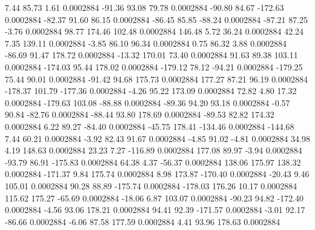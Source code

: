         7.44       85.73        1.61     0.0002884
      -91.36       93.08       79.78     0.0002884
      -90.80       84.67     -172.63     0.0002884
      -82.37       91.60       86.15     0.0002884
      -86.45       85.85      -88.24     0.0002884
      -87.21       87.25       -3.76     0.0002884
       98.77      174.46      102.48     0.0002884
      146.48        5.72       36.24     0.0002884
       42.24        7.35      139.11     0.0002884
       -3.85       86.10       96.34     0.0002884
        0.75       86.32        3.88     0.0002884
      -86.69       91.47      178.72     0.0002884
      -13.32      170.01       73.40     0.0002884
       91.63       89.38      103.11     0.0002884
     -174.03       95.44      178.02     0.0002884
     -179.12       78.12      -94.21     0.0002884
     -179.25       75.44       90.01     0.0002884
      -91.42       94.68      175.73     0.0002884
      177.27       87.21       96.19     0.0002884
     -178.37      101.79     -177.36     0.0002884
       -4.26       95.22      173.09     0.0002884
       72.82        4.80       17.32     0.0002884
     -179.63      103.08      -88.88     0.0002884
      -89.36       94.20       93.18     0.0002884
       -0.57       90.84      -82.76     0.0002884
      -88.44       93.80      178.69     0.0002884
      -89.53       82.82      174.32     0.0002884
        6.22       89.27      -84.40     0.0002884
      -45.75      178.41     -134.46     0.0002884
     -144.68        7.44       60.21     0.0002884
       -3.92       82.43       91.67     0.0002884
       -4.85       91.02       -4.81     0.0002884
       34.98        4.19      148.63     0.0002884
       23.23        7.27     -116.89     0.0002884
      177.08       89.97       -3.94     0.0002884
      -93.79       86.91     -175.83     0.0002884
       64.38        4.37      -56.37     0.0002884
      138.06      175.97      138.32     0.0002884
     -171.37        9.84      175.74     0.0002884
        8.98      173.87     -170.40     0.0002884
      -20.43        9.46      105.01     0.0002884
       90.28       88.89     -175.74     0.0002884
     -178.03      176.26       10.17     0.0002884
      115.62      175.27      -65.69     0.0002884
      -18.06        6.87      103.07     0.0002884
      -90.23       94.82     -172.40     0.0002884
       -4.56       93.06      178.21     0.0002884
       94.41       92.39     -171.57     0.0002884
       -3.01       92.17      -86.66     0.0002884
       -6.06       87.58      177.59     0.0002884
        4.41       93.96      178.63     0.0002884
